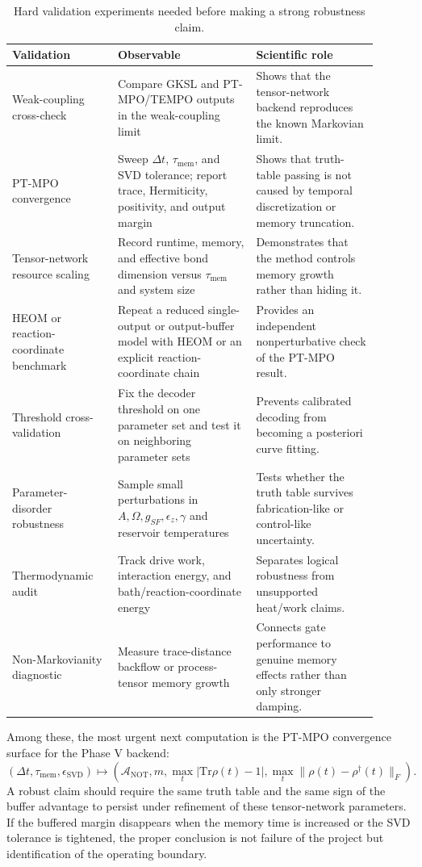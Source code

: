 \documentclass[11pt]{article}
\begin{document}
\begin{table}[H]
\centering
\caption{Hard validation experiments needed before making a strong robustness claim.}
\label{tab:hard-validation}
\begin{tabular}{p{0.26\linewidth}p{0.34\linewidth}p{0.30\linewidth}}
\toprule
Validation & Observable & Scientific role \\
\midrule
Weak-coupling cross-check &
Compare GKSL and PT-MPO/TEMPO outputs in the weak-coupling limit &
Shows that the tensor-network backend reproduces the known Markovian limit. \\
PT-MPO convergence &
Sweep $\Delta t$, $\tau_{\mathrm{mem}}$, and SVD tolerance; report trace, Hermiticity,
positivity, and output margin &
Shows that truth-table passing is not caused by temporal discretization or memory
truncation. \\
Tensor-network resource scaling &
Record runtime, memory, and effective bond dimension versus $\tau_{\mathrm{mem}}$ and
system size &
Demonstrates that the method controls memory growth rather than hiding it. \\
HEOM or reaction-coordinate benchmark &
Repeat a reduced single-output or output-buffer model with HEOM or an explicit
reaction-coordinate chain &
Provides an independent nonperturbative check of the PT-MPO result. \\
Threshold cross-validation &
Fix the decoder threshold on one parameter set and test it on neighboring parameter sets &
Prevents calibrated decoding from becoming a posteriori curve fitting. \\
Parameter-disorder robustness &
Sample small perturbations in $A,\Omega,g_{SF},\epsilon_z,\gamma$ and reservoir
temperatures &
Tests whether the truth table survives fabrication-like or control-like uncertainty. \\
Thermodynamic audit &
Track drive work, interaction energy, and bath/reaction-coordinate energy &
Separates logical robustness from unsupported heat/work claims. \\
Non-Markovianity diagnostic &
Measure trace-distance backflow or process-tensor memory growth &
Connects gate performance to genuine memory effects rather than only stronger damping. \\
\bottomrule
\end{tabular}
\end{table}

Among these, the most urgent next computation is the PT-MPO convergence surface for the
Phase V backend:
\begin{equation}
    \left(\Delta t,\tau_{\mathrm{mem}},\epsilon_{\mathrm{SVD}}\right)
    \longmapsto
    \left(
        \mathcal{A}_{\mathrm{NOT}},
        m,
        \max_t|\mathrm{Tr}\rho(t)-1|,
        \max_t\|\rho(t)-\rho^\dagger(t)\|_F
    \right).
\end{equation}
A robust claim should require the same truth table and the same sign of the buffer
advantage to persist under refinement of these tensor-network parameters.  If the buffered
margin disappears when the memory time is increased or the SVD tolerance is tightened, the
proper conclusion is not failure of the project but identification of the operating boundary.
\end{document}
